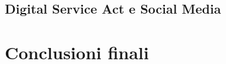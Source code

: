 \documentclass{article}
\begin{document}
\centering\newpage\subsection{Digital Service Act e Social Media}
\begin{justify}
    
\end{justify}

\centering
\newpage\section{Conclusioni finali}

\newpage

\end{document}
